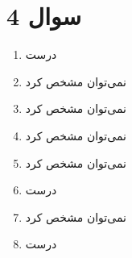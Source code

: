 \section*{سوال 4}
\begin{enumerate}
    \item درست
    \item نمی‌توان مشخص کرد
    \item نمی‌توان مشخص کرد
    \item نمی‌توان مشخص کرد
    \item نمی‌توان مشخص کرد
    \item درست
    \item نمی‌توان مشخص کرد
    \item درست
\end{enumerate}